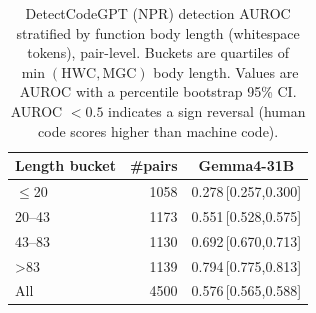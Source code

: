 \begin{table}[t]
\centering
\caption{DetectCodeGPT (NPR) detection AUROC stratified by function body length (whitespace tokens), pair-level. Buckets are quartiles of $\min(\text{HWC},\text{MGC})$ body length. Values are AUROC with a percentile bootstrap 95\% CI. AUROC $<0.5$ indicates a sign reversal (human code scores higher than machine code).}
\label{tab:auroc-by-length}
\begin{tabular}{lrc}
\toprule
Length bucket & \#pairs & Gemma4-31B \\
\midrule
$\leq$20 & 1058 & 0.278\,\tiny[0.257,0.300] \\
20--43 & 1173 & 0.551\,\tiny[0.528,0.575] \\
43--83 & 1130 & 0.692\,\tiny[0.670,0.713] \\
>83 & 1139 & 0.794\,\tiny[0.775,0.813] \\
\midrule
All & 4500 & 0.576\,\tiny[0.565,0.588] \\
\bottomrule
\end{tabular}
\end{table}
